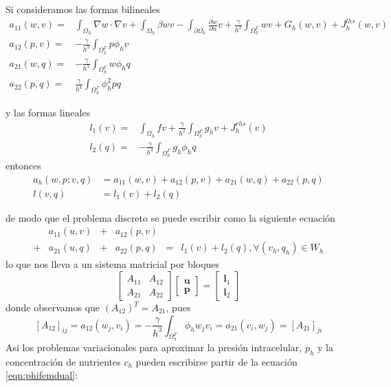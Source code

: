 Si consideramos las formas bilineales
\begin{align}
	a_{11}(w,v)=&	\int_{\Omega_h}\nabla w \cdot \nabla v +	\int_{\Omega_h} \beta wv-\int_{\partial \Omega_h}\frac{\partial w}{\partial n}v+  \frac{\gamma}{h^2} \int_{\Omega_h^\Gamma}wv    
	+ G_h(w,v) + J_h^{lhs}(w,v)  %
	\\
	a_{12}(p,v)=&	-\frac{\gamma}{h^3}  \int_{\Omega_h^\Gamma}  p \phi_h v
	\\
	a_{21}(w,q)=&	-\frac{\gamma}{h^3}  \int_{\Omega_h^\Gamma} w \phi_h q
	\\
	a_{22}(p,q)=&	\frac{\gamma}{h^4}  \int_{\Omega_h^\Gamma} \phi_h^2 p q
\end{align}

y las formas lineales
\begin{align}
	l_1(v) =&  \int_{\Omega_h} fv + \frac{\gamma}{h^2}  \int_{\Omega_h^\Gamma} g_h v +J_h^{rhs}(v)
	\\
	l_2(q)	=& - \frac{\gamma}{h^3}  \int_{\Omega_h^\Gamma} g_h \phi_h q
\end{align}
entonces
\[
\begin{aligned}
	a_h(w,p;v,q) &= a_{11}(w,v) + a_{12}(p,v)  + a_{21}(w,q)+ a_{22}(p,q) \\
	l(v,q) &=l_1(v)+l_2(q)
\end{aligned}
\]

de modo que el problema discreto se puede escribir como la siguiente ecuación
\[
\begin{matrix}
	&a_{11}(u,v) &+ &a_{12}(p,v) &  & \\
	+&a_{21}(u,q) &+ &a_{22}(p,q) & = & l_1(v)+l_2(q), \forall (v_h,q_h)\in W_h
\end{matrix}
\]
lo que nos lleva a un sistema matricial por bloques
\[
\begin{bmatrix}
	A_{11} & A_{12} \\
	A_{21} & A_{22} 
\end{bmatrix}
\begin{bmatrix}
	\bm{u} \\
	\bm{p} 
\end{bmatrix}=
\begin{bmatrix}
	\bm{l}_1 \\
	\bm{l}_2
\end{bmatrix}
\]
donde observamos que $(A_{12})^T = A_{21}$, pues \[
[A_{12}]_{ij}=a_{12}(w_j,v_i)=	-\frac{\gamma}{h^3}  \int_{\Omega_h^\Gamma} \phi_h w_j v_i=
a_{21}(v_i,w_j)=[A_{21}]_{ji}
\]
Asi los problemas variacionales para aproximar la presión intracelular, $p_h$ y la concentración de nutrientes $c_h$ pueden escribirse  partir de la ecuación  
\ref{eqn:phifemdual}:

